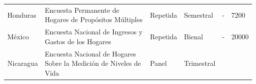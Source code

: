 \begin{longtable}[]{@{}llllll@{}}
\begin{minipage}[t]{0.13\columnwidth}
Honduras\strut
\end{minipage} & \begin{minipage}[t]{0.38\columnwidth}\raggedright
Encuesta Permanente de Hogares de Propósitos Múltiples\strut
\end{minipage} & \begin{minipage}[t]{0.06\columnwidth}\raggedright
Repetida\strut
\end{minipage} & \begin{minipage}[t]{0.08\columnwidth}\raggedright
Semestral\strut
\end{minipage} & \begin{minipage}[t]{0.06\columnwidth}\raggedright
-\strut
\end{minipage} & \begin{minipage}[t]{0.13\columnwidth}\raggedright
7200\strut
\end{minipage}\tabularnewline
\begin{minipage}[t]{0.13\columnwidth}\raggedright
México\strut
\end{minipage} & \begin{minipage}[t]{0.38\columnwidth}\raggedright
Encuesta Nacional de Ingresos y Gastos de los Hogares\strut
\end{minipage} & \begin{minipage}[t]{0.06\columnwidth}\raggedright
Repetida\strut
\end{minipage} & \begin{minipage}[t]{0.08\columnwidth}\raggedright
Bienal\strut
\end{minipage} & \begin{minipage}[t]{0.06\columnwidth}\raggedright
-\strut
\end{minipage} & \begin{minipage}[t]{0.13\columnwidth}\raggedright
20000\strut
\end{minipage}\tabularnewline
\begin{minipage}[t]{0.13\columnwidth}\raggedright
Nicaragua\strut
\end{minipage} & \begin{minipage}[t]{0.38\columnwidth}\raggedright
Encuesta Nacional de Hogares Sobre la Medición de Niveles de Vida\strut
\end{minipage} & \begin{minipage}[t]{0.06\columnwidth}\raggedright
Panel\strut
\end{minipage} & \begin{minipage}[t]{0.08\columnwidth}\raggedright
Trimestral\strut
\end{minipage} & \begin{minipage}[t]{0.06\columnwidth}\raggedright

\end{minipage}
\end{longtable}
